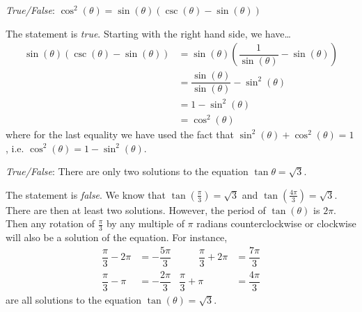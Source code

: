 \documentclass[11pt,letterpaper]{article}
\begin{document}
\newpage



\quizsol \textit{True/False}: $\cos^2(\theta)= \sin(\theta) \left( \csc(\theta) - \sin(\theta) \right)$ \pspace

\sol The statement is \textit{true}. Starting with the right hand side, we have\dots
	\[
	\begin{aligned}
	 \sin(\theta) \left( \csc(\theta) - \sin(\theta) \right)&=  \sin(\theta) \left( \dfrac{1}{\sin(\theta)} - \sin(\theta) \right) \\[0.3cm]
	 &= \dfrac{\sin(\theta)}{\sin(\theta)} - \sin^2(\theta) \\[0.3cm]
	 &= 1 - \sin^2(\theta) \\[0.3cm]
	 &= \cos^2(\theta)
	\end{aligned}
	\]
where for the last equality we have used the fact that $\sin^2(\theta) + \cos^2(\theta)= 1$, i.e. $\cos^2(\theta)= 1 - \sin^2(\theta)$. \pvspace{1.3cm}



\quizsol \textit{True/False}: There are only two solutions to the equation $\tan \theta= \sqrt{3}$. \pspace

\sol The statement is \textit{false}. We know that $\tan \left( \frac{\pi}{3} \right)= \sqrt{3}$ and $\tan \left( \frac{4\pi}{3} \right)= \sqrt{3}$. There are then at least two solutions. However, the period of $\tan(\theta)$ is $2\pi$. Then any rotation of $\frac{\pi}{3}$ by any multiple of $\pi$ radians counterclockwise or clockwise will also be a solution of the equation. For instance, 
	\[
	\begin{aligned}
	\dfrac{\pi}{3} - 2 \pi&= -\dfrac{5\pi}{3} &\qquad \dfrac{\pi}{3} + 2\pi&= \dfrac{7\pi}{3} \\[0.3cm]
	\dfrac{\pi}{3} - \pi&= -\dfrac{2\pi}{3} & \dfrac{\pi}{3} + \pi&= \dfrac{4\pi}{3}
	\end{aligned}
	\]
are all solutions to the equation $\tan(\theta)= \sqrt{3}$. 
\end{document}
